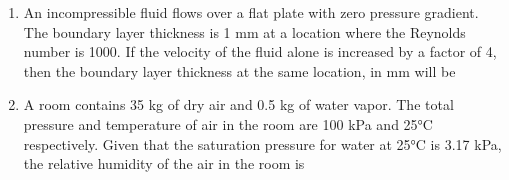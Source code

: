 \documentclass[journal,12pt,onecolumn]{IEEEtran}
\begin{document}
\begin{enumerate}[resume]
          \begin{enumerate}
          \end{enumerate}

    \item An incompressible fluid flows over a flat plate with zero pressure gradient. The boundary layer thickness is 1 mm at a location where the Reynolds number is 1000. If the velocity of the fluid alone is increased by a factor of 4, then the boundary layer thickness at the same location, in mm will be

          \begin{enumerate}
          \end{enumerate}

    \item A room contains 35 kg of dry air and 0.5 kg of water vapor. The total pressure and temperature of air in the room are 100 kPa and 25°C respectively. Given that the saturation pressure for water at 25°C is 3.17 kPa, the relative humidity of the air in the room is

          \begin{enumerate}
          \end{enumerate}


\end{enumerate}
\end{document}
